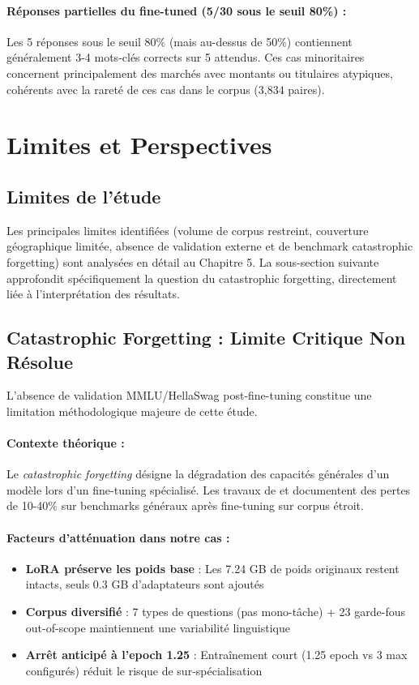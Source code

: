 \paragraph{Réponses partielles du fine-tuned (5/30 sous le seuil 80\%) :}
Les 5 réponses sous le seuil 80\% (mais au-dessus de 50\%) contiennent généralement 3-4 mots-clés corrects sur 5 attendus. Ces cas minoritaires concernent principalement des marchés avec montants ou titulaires atypiques, cohérents avec la rareté de ces cas dans le corpus (3,834 paires).

\section{Limites et Perspectives}

\subsection{Limites de l'étude}

Les principales limites identifiées (volume de corpus restreint, couverture géographique limitée, absence de validation externe et de benchmark catastrophic forgetting) sont analysées en détail au Chapitre 5. La sous-section suivante approfondit spécifiquement la question du catastrophic forgetting, directement liée à l'interprétation des résultats.

\subsection{Catastrophic Forgetting : Limite Critique Non Résolue}
\label{subsec:catastrophic_forgetting}

L'absence de validation MMLU/HellaSwag post-fine-tuning constitue une limitation méthodologique majeure de cette étude.

\paragraph{Contexte théorique :}
Le \textit{catastrophic forgetting} \citep{kirkpatrick2017overcoming} désigne la dégradation des capacités générales d'un modèle lors d'un fine-tuning spécialisé. Les travaux de \citet{french1999catastrophic} et \citet{mccloskey1989catastrophic} documentent des pertes de 10-40\% sur benchmarks généraux après fine-tuning sur corpus étroit.

\paragraph{Facteurs d'atténuation dans notre cas :}
\begin{itemize}
    \item \textbf{LoRA préserve les poids base} : Les 7.24 GB de poids originaux restent intacts, seuls 0.3 GB d'adaptateurs sont ajoutés
    \item \textbf{Corpus diversifié} : 7 types de questions (pas mono-tâche) + 23 garde-fous out-of-scope maintiennent une variabilité linguistique
    \item \textbf{Arrêt anticipé à l'epoch 1.25} : Entraînement court (1.25 epoch vs 3 max configurés) réduit le risque de sur-spécialisation
\end{itemize}


